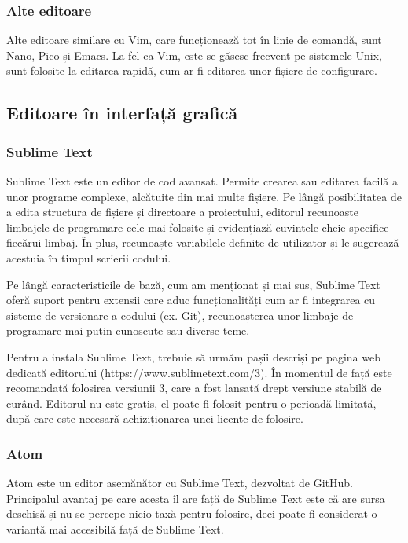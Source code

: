 \subsubsection{Alte editoare}
\label{sec:appdev:dev:editor:other}

Alte editoare similare cu Vim, care funcționează tot în linie de comandă, sunt
Nano, Pico și Emacs. La fel ca Vim, este se găsesc frecvent pe sistemele Unix, sunt
folosite la editarea rapidă, cum ar fi editarea unor fișiere de configurare.

\subsection{Editoare în interfață grafică}
\label{sec:appdev:dev:editor-gui}

\subsubsection{Sublime Text}
\label{sec:appdev:dev:editor-gui:sublime}

Sublime Text este un editor de cod avansat. Permite crearea sau editarea
facilă a unor programe complexe, alcătuite din mai multe fișiere. Pe lângă
posibilitatea de a edita structura de fișiere și directoare a proiectului,
editorul recunoaște limbajele de programare cele mai folosite și evidențiază
cuvintele cheie specifice fiecărui limbaj. În plus, recunoaște variabilele
definite de utilizator și le sugerează acestuia în timpul scrierii codului.

Pe lângă caracteristicile de bază, cum am menționat și mai sus, Sublime Text
oferă suport pentru extensii care aduc funcționalități cum ar fi integrarea cu sisteme de
versionare a codului (ex. Git), recunoașterea unor limbaje de programare mai
puțin cunoscute sau diverse teme.

Pentru a instala Sublime Text, trebuie să urmăm pașii descriși pe pagina web
dedicată editorului (https://www.sublimetext.com/3). În momentul de față este
recomandată folosirea versiunii 3, care a fost lansată drept versiune stabilă de
curând. Editorul nu este gratis, el poate fi folosit pentru o perioadă limitată,
după care este necesară achiziționarea unei licențe de folosire.

\subsubsection{Atom}
\label{sec:appdev:dev:editor-gui:atom}

Atom este un editor asemănător cu Sublime Text, dezvoltat de GitHub. Principalul
avantaj pe care acesta îl are față de Sublime Text este că are sursa deschisă și
nu se percepe nicio taxă pentru folosire, deci poate fi considerat o variantă
mai accesibilă față de Sublime Text.

